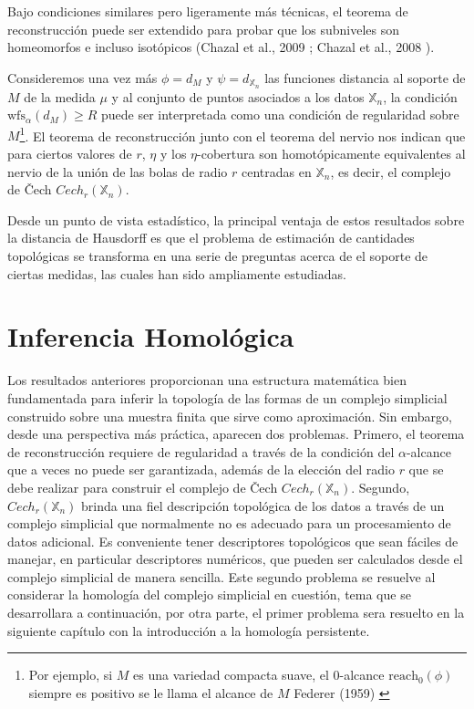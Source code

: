 Bajo condiciones similares pero ligeramente m\'as t\'ecnicas, el teorema de reconstrucci\'on puede ser
extendido para probar que los subniveles son homeomorfos e incluso isot\'opicos
(Chazal et al., 2009 \cite{Chazal2009c}; Chazal et al., 2008 \cite{Chazal2008}).

Consideremos una vez m\'as $\phi = d_{M}$ y $\psi = d_{\mathbb{X}_{n}}$ las funciones distancia
al soporte de $M$ de la medida $\mu$ y al conjunto de puntos asociados a los datos $\mathbb{X}_{n}$,
la condici\'on $\mathrm{wfs}_{\alpha}\left(d_{M}\right)\geq R$ puede ser interpretada como una
condici\'on de regularidad sobre $M$\footnote{Por ejemplo, si $M$ es una variedad compacta suave,
el $0$-alcance $\mathrm{reach}_{0}\left(\phi\right)$ siempre es positivo se le llama el alcance de
$M$ Federer (1959) \cite{Federer1959}}. El teorema de reconstrucci\'on junto con el teorema del nervio
nos indican que para ciertos valores de $r$, $\eta$ y los $\eta$-cobertura son homot\'opicamente
equivalentes al nervio de la uni\'on de las bolas de radio $r$ centradas en $\mathbb{X}_{n}$, es decir,
el complejo de \v Cech $Cech_{r}\left(\mathbb{X}_{n}\right)$.

Desde un punto de vista estad\'istico, la principal ventaja de estos resultados sobre la distancia de
Hausdorff es que el problema de estimaci\'on de cantidades topol\'ogicas se transforma en una serie
de preguntas acerca de el soporte de ciertas medidas, las cuales han sido ampliamente estudiadas.

\section{Inferencia Homol\'ogica}

Los resultados anteriores proporcionan una estructura matem\'atica bien fundamentada para inferir la
topolog\'ia de las formas de un complejo simplicial construido sobre una muestra finita que sirve como
aproximaci\'on. Sin embargo, desde una perspectiva m\'as pr\'actica, aparecen dos problemas. Primero, el
teorema de reconstrucci\'on requiere de regularidad a trav\'es de la condici\'on del $\alpha$-alcance
que a veces no puede ser garantizada, adem\'as de la elecci\'on del radio $r$ que se debe realizar para
construir el complejo de \v Cech $Cech_{r}\left(\mathbb{X}_{n}\right)$. Segundo,
$Cech_{r}\left(\mathbb{X}_{n}\right)$ brinda una fiel descripci\'on topol\'ogica de los datos a trav\'es
de un complejo simplicial que normalmente no es adecuado para un procesamiento de datos adicional. Es
conveniente tener descriptores topol\'ogicos que sean f\'aciles de manejar, en particular descriptores
num\'ericos, que pueden ser calculados desde el complejo simplicial de manera sencilla. Este segundo
problema se resuelve al considerar la homolog\'ia del complejo simplicial en cuesti\'on,
tema que se desarrollara a continuaci\'on, por otra parte, el primer problema sera resuelto
en la siguiente cap\'itulo con la introducci\'on a la homolog\'ia persistente.

